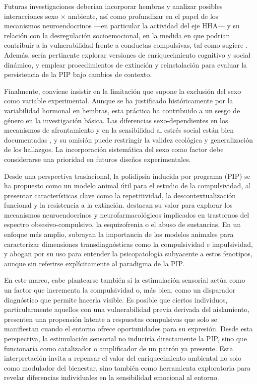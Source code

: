 \documentclass[12pt,a4paper]{article}
\begin{document}
\begin{multicols}{2}
Futuras investigaciones deberían incorporar hembras y analizar posibles interacciones sexo × ambiente, así como profundizar en el papel de los mecanismos neuroendocrinos —en particular la actividad del eje HHA— y su relación con la desregulación socioemocional, en la medida en que podrían contribuir a la vulnerabilidad frente a conductas compulsivas, tal como sugiere \citet{MartinGonzalez2022}. Además, sería pertinente explorar versiones de enriquecimiento cognitivo y social dinámico, y emplear procedimientos de extinción y reinstalación para evaluar la persistencia de la PIP bajo cambios de contexto.

Finalmente, conviene insistir en la limitación que supone la exclusión del sexo como variable experimental. Aunque se ha justificado históricamente por la variabilidad hormonal en hembras, esta práctica ha contribuido a un sesgo de género en la investigación básica. Las diferencias sexo-dependientes en los mecanismos de afrontamiento y en la sensibilidad al estrés social están bien documentadas \citep{Bowman2006, Barha2011}, y su omisión puede restringir la validez ecológica y generalización de los hallazgos. La incorporación sistemática del sexo como factor debe considerarse una prioridad en futuros diseños experimentales.

Desde una perspectiva traslacional, la polidipsia inducida por programa (PIP) se ha propuesto como un modelo animal útil para el estudio de la compulsividad, al presentar características clave como la repetitividad, la descontextualización funcional y la resistencia a la extinción. \citet{Moreno2012} destacan su valor para explorar los mecanismos neuroendocrinos y neurofarmacológicos implicados en trastornos del espectro obsesivo-compulsivo, la esquizofrenia o el abuso de sustancias. En un enfoque más amplio, \citet{Fineberg2010} subrayan la importancia de los modelos animales para caracterizar dimensiones transdiagnósticas como la compulsividad e impulsividad, y abogan por su uso para entender la psicopatología subyacente a estos fenotipos, aunque sin referirse explícitamente al paradigma de la PIP.

En este marco, cabe plantearse también si la estimulación sensorial actúa como un factor que incrementa la compulsividad o, más bien, como un disparador diagnóstico que permite hacerla visible. Es posible que ciertos individuos, particularmente aquellos con una vulnerabilidad previa derivada del aislamiento, presenten una propensión latente a respuestas compulsivas que solo se manifiestan cuando el entorno ofrece oportunidades para su expresión. Desde esta perspectiva, la estimulación sensorial no induciría directamente la PIP, sino que funcionaría como catalizador o amplificador de un patrón ya presente. Esta interpretación invita a repensar el valor del enriquecimiento ambiental no solo como modulador del bienestar, sino también como herramienta exploratoria para revelar diferencias individuales en la sensibilidad emocional al entorno.


\end{multicols}
\end{document}
